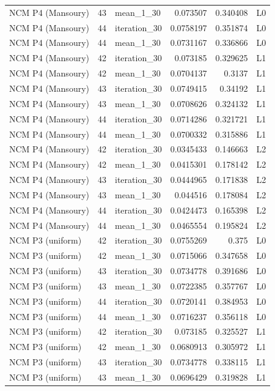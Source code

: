 \begin{table}[htbp!]
\begin{tabular}{lrlrrl}
NCM P4 (Mansoury) & 43 & mean\_1\_30 & 0.073507 & 0.340408 & L0 \\
NCM P4 (Mansoury) & 44 & iteration\_30 & 0.0758197 & 0.351874 & L0 \\
NCM P4 (Mansoury) & 44 & mean\_1\_30 & 0.0731167 & 0.336866 & L0 \\
NCM P4 (Mansoury) & 42 & iteration\_30 & 0.073185 & 0.329625 & L1 \\
NCM P4 (Mansoury) & 42 & mean\_1\_30 & 0.0704137 & 0.3137 & L1 \\
NCM P4 (Mansoury) & 43 & iteration\_30 & 0.0749415 & 0.34192 & L1 \\
NCM P4 (Mansoury) & 43 & mean\_1\_30 & 0.0708626 & 0.324132 & L1 \\
NCM P4 (Mansoury) & 44 & iteration\_30 & 0.0714286 & 0.321721 & L1 \\
NCM P4 (Mansoury) & 44 & mean\_1\_30 & 0.0700332 & 0.315886 & L1 \\
NCM P4 (Mansoury) & 42 & iteration\_30 & 0.0345433 & 0.146663 & L2 \\
NCM P4 (Mansoury) & 42 & mean\_1\_30 & 0.0415301 & 0.178142 & L2 \\
NCM P4 (Mansoury) & 43 & iteration\_30 & 0.0444965 & 0.171838 & L2 \\
NCM P4 (Mansoury) & 43 & mean\_1\_30 & 0.044516 & 0.178084 & L2 \\
NCM P4 (Mansoury) & 44 & iteration\_30 & 0.0424473 & 0.165398 & L2 \\
NCM P4 (Mansoury) & 44 & mean\_1\_30 & 0.0465554 & 0.195824 & L2 \\
NCM P3 (uniform) & 42 & iteration\_30 & 0.0755269 & 0.375 & L0 \\
NCM P3 (uniform) & 42 & mean\_1\_30 & 0.0715066 & 0.347658 & L0 \\
NCM P3 (uniform) & 43 & iteration\_30 & 0.0734778 & 0.391686 & L0 \\
NCM P3 (uniform) & 43 & mean\_1\_30 & 0.0722385 & 0.357767 & L0 \\
NCM P3 (uniform) & 44 & iteration\_30 & 0.0720141 & 0.384953 & L0 \\
NCM P3 (uniform) & 44 & mean\_1\_30 & 0.0716237 & 0.356118 & L0 \\
NCM P3 (uniform) & 42 & iteration\_30 & 0.073185 & 0.325527 & L1 \\
NCM P3 (uniform) & 42 & mean\_1\_30 & 0.0680913 & 0.305972 & L1 \\
NCM P3 (uniform) & 43 & iteration\_30 & 0.0734778 & 0.338115 & L1 \\
NCM P3 (uniform) & 43 & mean\_1\_30 & 0.0696429 & 0.319828 & L1 \\

\end{tabular}
\end{table}
